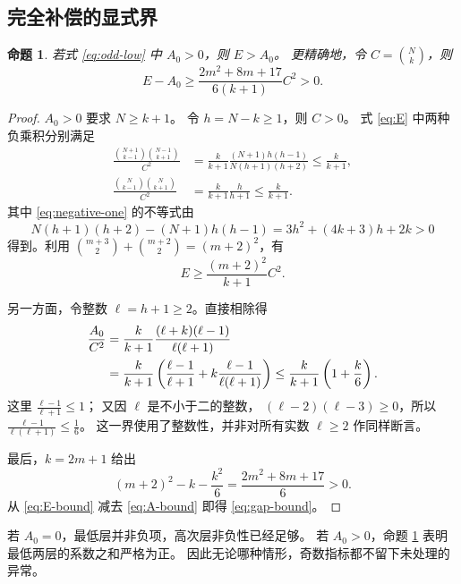 \documentclass[UTF8,a4paper,11pt,fontset=none]{ctexart}
\numberwithin{equation}{section}
\theoremstyle{paperplain}
\newtheorem{proposition}[theorem]{命题}
\theoremstyle{definition}
\theoremstyle{remark}
\begin{document}
\subsection{完全补偿的显式界}
\begin{proposition}\label{prop:compensation}
若式 \eqref{eq:odd-low} 中 $A_0>0$，则 $E>A_0$。
更精确地，令 $C=\binom Nk$，则
\begin{equation}\label{eq:gap-bound}
E-A_0\ge
\frac{2m^2+8m+17}{6(k+1)}C^2>0.
\end{equation}
\end{proposition}
\begin{proof}
$A_0>0$ 要求 $N\ge k+1$。
令 $h=N-k\ge1$，则 $C>0$。
式 \eqref{eq:E} 中两种负乘积分别满足
\begin{align}
\frac{\binom{N+1}{k-1}\binom{N-1}{k+1}}{C^2}
&=\frac{k}{k+1}
\frac{(N+1)h(h-1)}{N(h+1)(h+2)}
\le\frac{k}{k+1},\label{eq:negative-one}\\
\frac{\binom N{k-1}\binom N{k+1}}{C^2}
&=\frac{k}{k+1}\frac h{h+1}
\le\frac{k}{k+1}.\label{eq:negative-two}
\end{align}
其中 \eqref{eq:negative-one} 的不等式由
\[
N(h+1)(h+2)-(N+1)h(h-1)
=3h^2+(4k+3)h+2k>0
\]
得到。利用
$\binom{m+3}{2}+\binom{m+2}{2}=(m+2)^2$，有
\begin{equation}\label{eq:E-bound}
E\ge\frac{(m+2)^2}{k+1}C^2.
\end{equation}

另一方面，令整数 $\ell=h+1\ge2$。直接相除得
\begin{align}
\frac{A_0}{C^2}
&=\frac{k}{k+1}
\frac{(\ell+k)(\ell-1)}{\ell(\ell+1)}\notag\\
&=\frac{k}{k+1}
\left(\frac{\ell-1}{\ell+1}
+k\frac{\ell-1}{\ell(\ell+1)}\right)
\le\frac{k}{k+1}\left(1+\frac k6\right).\label{eq:A-bound}
\end{align}
这里 $\frac{\ell-1}{\ell+1}\le1$；
又因 $\ell$ 是不小于二的整数，
$(\ell-2)(\ell-3)\ge0$，所以
$\frac{\ell-1}{\ell(\ell+1)}\le\frac16$。
这一界使用了整数性，并非对所有实数 $\ell\ge2$ 作同样断言。

最后，$k=2m+1$ 给出
\[
(m+2)^2-k-\frac{k^2}{6}
=\frac{2m^2+8m+17}{6}>0.
\]
从 \eqref{eq:E-bound} 减去 \eqref{eq:A-bound} 即得 \eqref{eq:gap-bound}。
\end{proof}

若 $A_0=0$，最低层并非负项，高次层非负性已经足够。
若 $A_0>0$，命题 \ref{prop:compensation} 表明最低两层的系数之和严格为正。
因此无论哪种情形，奇数指标都不留下未处理的异常。
\end{document}
